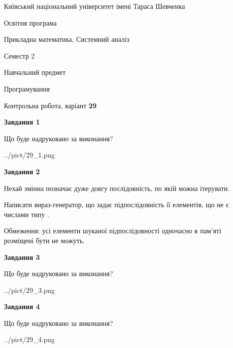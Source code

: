 \documentclass[12pt, ukrainian]{article}
\begin{document}
{{\begin {small}\par
{ \center  Київський національний університет імені Тараса Шевченка \par}
{\parbox {5 cm}{Освітня програма \hfill}{\parbox {8 cm}{Прикладна математика, Системний аналіз \hfill}}\parbox {5 cm}{\hfill Семестр 2}}\par
{\parbox {5 cm} {Навчальний предмет \hfill}\parbox {7 cm}{Програмування \hfill}\parbox {6cm}{\hfill}\par}\vspace{-7pt} \end{small}}{\center Контрольна робота, варіант  \No \textbf
{ 29 }\par}}
{
\begin {large}
{\begin {center}\textbf{Завдання 1}\end {center}}\par
Що буде надруковано за виконання?\par\par
\begin{center}
	{../pict/29_1.png}
\end{center}
\newpage

{\begin {center}\textbf{Завдання 2}\end {center}}\par
Нехай змінна  позначає дуже довгу послідовність, по якій можна ітерувати.

Написати вираз-генератор, що задає підпослідовність її елементів, що не є числами типу .

Обмеження: усі елементи шуканої підпослідовності одночасно в пам'яті розміщені бути не можуть.\par
\newpage

{\begin {center}\textbf{Завдання 3}\end {center}}\par
Що буде надруковано за виконання?
\begin{center}
	{../pict/29_3.png}
\end{center}
\newpage

{\begin {center}\textbf{Завдання 4}\end {center}}\par
Що буде надруковано за виконання?\par
\begin{center}
	{../pict/29_4.png}
\end{center}
\newpage


\end{large}}
\end{document}
